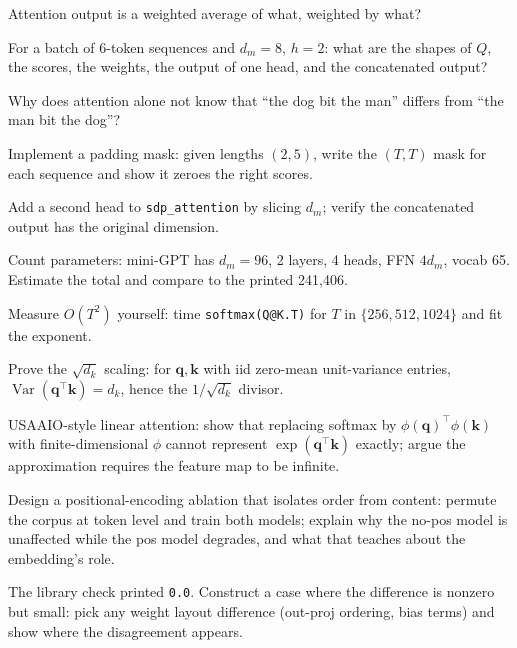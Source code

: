 \begin{exercise}[{[easy]}]
Attention output is a weighted average of what, weighted by what?
\end{exercise}
\begin{exercise}[{[easy]}]
For a batch of 6-token sequences and $d_m{=}8$, $h{=}2$: what are the
shapes of $Q$, the scores, the weights, the output of one head, and
the concatenated output?
\end{exercise}
\begin{exercise}[{[easy]}]
Why does attention alone not know that ``the dog bit the man''
differs from ``the man bit the dog''?
\end{exercise}
\begin{exercise}[{[medium]}]
Implement a padding mask: given lengths $(2,5)$, write the $(T,T)$
mask for each sequence and show it zeroes the right scores.
\end{exercise}
\begin{exercise}[{[medium]}]
Add a second head to \texttt{sdp\_attention} by slicing $d_m$; verify
the concatenated output has the original dimension.
\end{exercise}
\begin{exercise}[{[medium]}]
Count parameters: mini-GPT has $d_m{=}96$, 2 layers, 4 heads, FFN
$4d_m$, vocab 65. Estimate the total and compare to the printed
241{,}406.
\end{exercise}
\begin{exercise}[{[medium]}]
Measure $O(T^2)$ yourself: time \texttt{softmax(Q@K.T)} for $T$ in
$\{256,512,1024\}$ and fit the exponent.
\end{exercise}
\begin{exercise}[{[hard]}]
Prove the $\sqrt{d_k}$ scaling: for $\mathbf q,\mathbf k$ with iid
zero-mean unit-variance entries,
$\operatorname{Var}(\mathbf q^\top\mathbf k)=d_k$, hence the
$1/\sqrt{d_k}$ divisor.
\end{exercise}
\begin{exercise}[{[hard]}]
USAAIO-style linear attention: show that replacing softmax by
$\phi(\mathbf q)^\top\phi(\mathbf k)$ with finite-dimensional $\phi$
cannot represent $\exp(\mathbf q^\top\mathbf k)$ exactly; argue the
approximation requires the feature map to be infinite.
\end{exercise}
\begin{exercise}[{[hard]}]
Design a positional-encoding ablation that isolates order from
content: permute the corpus at token level and train both models;
explain why the no-pos model is unaffected while the pos model
degrades, and what that teaches about the embedding's role.
\end{exercise}
\begin{exercise}[{[hard]}]
The library check printed \texttt{0.0}. Construct a case where the
difference is nonzero but small: pick any weight layout difference
(out-proj ordering, bias terms) and show where the disagreement
appears.
\end{exercise}

